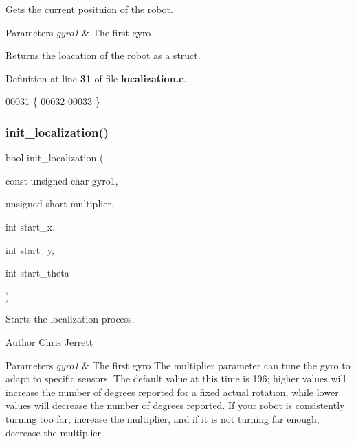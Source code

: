 Gets the current posituion of the robot. 


\begin{DoxyParams}{Parameters}
{\em gyro1} & The first gyro \\
\hline
\end{DoxyParams}
\begin{DoxyReturn}{Returns}
the loacation of the robot as a struct. 
\end{DoxyReturn}


Definition at line \textbf{ 31} of file \textbf{ localization.\+c}.


\begin{DoxyCode}
00031                                \{
00032 
00033 \}
\end{DoxyCode}
\mbox{\label{localization_8h_afdd0147de6aa15957e9a125f9cd20578}} 
\subsubsection{init\+\_\+localization()}
{\footnotesize\ttfamily bool init\+\_\+localization (\begin{DoxyParamCaption}\item[{const unsigned char}]{gyro1,  }\item[{unsigned short}]{multiplier,  }\item[{int}]{start\+\_\+x,  }\item[{int}]{start\+\_\+y,  }\item[{int}]{start\+\_\+theta }\end{DoxyParamCaption})}



Starts the localization process. 

\begin{DoxyAuthor}{Author}
Chris Jerrett
\end{DoxyAuthor}

\begin{DoxyParams}{Parameters}
{\em gyro1} & The first gyro  The multiplier parameter can tune the gyro to adapt to specific sensors. The default value at this time is 196; higher values will increase the number of degrees reported for a fixed actual rotation, while lower values will decrease the number of degrees reported. If your robot is consistently turning too far, increase the multiplier, and if it is not turning far enough, decrease the multiplier. \\
\hline
\end{DoxyParams}


